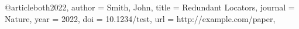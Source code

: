 @article{both2022,
  author = {Smith, John},
  title = {Redundant Locators},
  journal = {Nature},
  year = {2022},
  doi = {10.1234/test},
  url = {http://example.com/paper},
}
